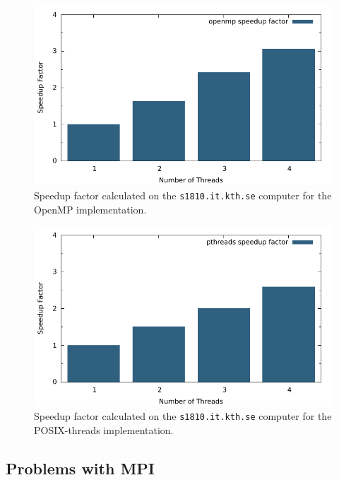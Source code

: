 \begin{figure}[H]
	\includegraphics{plots/openmp_speedup.pdf}
	\caption{Speedup factor calculated on the \texttt{s1810.it.kth.se} computer for the OpenMP implementation.}
\end{figure}
\begin{figure}[H]
	\includegraphics{plots/pthreads_speedup.pdf}
	\caption{Speedup factor calculated on the \texttt{s1810.it.kth.se} computer for the POSIX-threads implementation.}
\end{figure}


\subsection{Problems with MPI}

